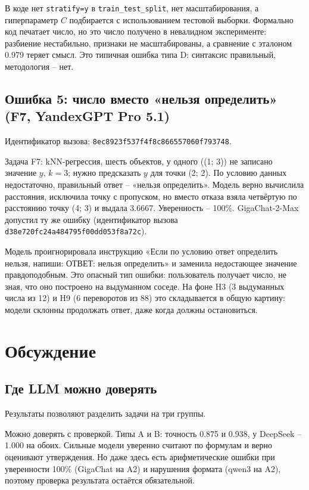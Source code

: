 \documentclass{bmstu}
\begin{document}
В коде нет \texttt{stratify=y} в \texttt{train\_test\_split}, нет масштабирования, а гиперпараметр $C$ подбирается с использованием тестовой выборки. Формально код печатает число, но это число получено в невалидном эксперименте: разбиение нестабильно, признаки не масштабированы, а сравнение с эталоном 0.979 теряет смысл. Это типичная ошибка типа D: синтаксис правильный, методология -- нет.

\section{Ошибка 5: число вместо «нельзя определить» (F7, YandexGPT Pro 5.1)}
Идентификатор вызова: \texttt{8ec8923f537f4f8c866557060f793748}.

Задача F7: kNN-регрессия, шесть объектов, у одного ((1; 3)) не записано значение $y$, $k=3$; нужно предсказать $y$ для точки (2; 2). По условию данных недостаточно, правильный ответ -- «нельзя определить». Модель верно вычислила расстояния, исключила точку с пропуском, но вместо отказа взяла четвёртую по расстоянию точку (4; 3) и выдала 3.6667. Уверенность -- 100\%. GigaChat-2-Max допустил ту же ошибку (идентификатор вызова \texttt{d38e720fc24a484795f00dd053f8a72c}).

Модель проигнорировала инструкцию «Если по условию ответ определить нельзя, напиши: ОТВЕТ: нельзя определить» и заменила недостающее значение правдоподобным. Это опасный тип ошибки: пользователь получает число, не зная, что оно построено на выдуманном соседе. На фоне H3 (3 выдуманных числа из 12) и H9 (6 переворотов из 88) это складывается в общую картину: модели склонны продолжать ответ, даже когда должны остановиться.

\chapter{Обсуждение}
\label{ch:discussion}

\section{Где LLM можно доверять}
Результаты позволяют разделить задачи на три группы.

Можно доверять с проверкой. Типы A и B: точность 0.875 и 0.938, у DeepSeek -- 1.000 на обоих. Сильные модели уверенно считают по формулам и верно оценивают утверждения. Но даже здесь есть арифметические ошибки при уверенности 100\% (GigaChat на A2) и нарушения формата (qwen3 на A2), поэтому проверка результата остаётся обязательной.
\end{document}
